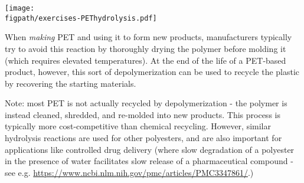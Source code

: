 \begin{activity}
\begin{exercises}
\begin{solution}
{		\centerline{\texttt{[image: \\figpath/exercises-PEThydrolysis.pdf]}}
				
				When \emph{making} PET and using it to form new products, manufacturers typically try to avoid this reaction by thoroughly drying the polymer before molding it (which requires elevated temperatures). At the end of the life of a PET-based product, however, this sort of depolymerization can be used to recycle the plastic by recovering the starting materials.
				
				Note: most PET is not actually recycled by depolymerization - the polymer is instead cleaned, shredded, and re-molded into new products.  This process is typically more cost-competitive than chemical recycling.  However, similar hydrolysis reactions are used for other polyesters, and are also important for applications like controlled drug delivery (where slow degradation of a polyester in the presence of water facilitates slow release of a pharmaceutical compound - see e.g. \url{https://www.ncbi.nlm.nih.gov/pmc/articles/PMC3347861/}.)
				}
			\end{solution}
			
			
		
		
\end{exercises}
	
\end{activity}